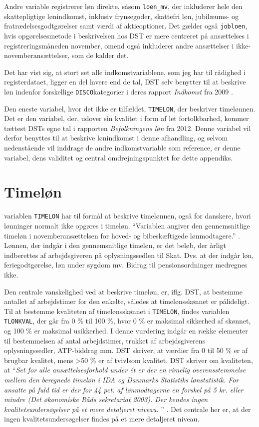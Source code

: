 Andre variable registrerer løn direkte, såsom \texttt{loen\_mv}, der inkluderer hele den skattepligtige lønindkomst, inklusiv frynsegoder, skattefri løn, jubilæums- og fratrædelsesgodtgørelser samt værdi af aktieoptioner. Det gælder også \texttt{jobloen}, hvis opgørelsesmetode i beskrivelsen hos DST er mere centreret på ansættelses i registreringsmåneden november, omend også inkluderer andre ansættelser i ikke-novemberansættelser, som de kalder det. \label{indkomstvariable}

Det har vist sig, at stort set alle indkomstvariablene, som jeg har til rådighed i registerdataet, ligger en del lavere end de tal, DST selv benytter til at beskrive løn indenfor forskellige \texttt{DISCO}kategorier i deres rapport \emph{Indkomst} fra 2009  \textcite{DST2009}.  

Den eneste variabel, hvor det ikke er tilfældet, \texttt{TIMELON}, der beskriver timelønnen. Det er den variabel, der, udover sin kvalitet i form af let fortolkbarhed, kommer tættest DSTs egne tal i rapporten \emph{Befolkningens løn} fra 2012. Denne variabel vil derfor benyttes til at beskrive lønindkomst i denne afhandling, og selvom nedenstående vil inddrage de andre indkomstvariable som reference, er denne variabel, dens validitet og central omdrejningspunktet for dette appendiks. 

\section{Timeløn \label{}}

variablen \texttt{TIMELON} har til formål at beskrive timelønnen, også for danskere, hvori lønninger normalt ikke opgøres i timeløn. “Variablen angiver den gennemsnitlige timeløn i novemberansættelsen for hoved- og bibeskæftigede lønmodtagere.” \parencite{DST-TIMELON}. Lønnen, der indgår i den gennemsnitlige timeløn, er det beløb, der årligt indberettes af arbejdsgiveren på oplysningssedlen til Skat. Dvs. at der indgår løn, feriegodtgørelse, løn under sygdom mv. Bidrag til pensionsordninger medregnes ikke. 

Den centrale vanskelighed ved at beskrive timeløn, er, iflg. DST, at bestemme antallet af arbejdstimer for den enkelte, således at timelønsskønnet er pålideligt. Til at bestemme kvaliteten af timelønsskønnet i \texttt{TIMELON}, findes variablen \texttt{TLONKVAL}, der går fra 0 \% til 100 \%, hvor 0 \% er maksimal sikkerhed af skønnet, og 100 \% er maksimal usikkerhed. I denne vurdering indgår en række elementer til bestemmelsen af antal arbejdstimer, trukket af arbejdsgiverens oplysningssedler, ATP-biddrag mm. DST skriver, at værdier fra 0 til 50 \% er af brugbar kvalitet, mens >50 \% er af tvivlsom kvalitet. DST skriver om kvaliteten, at “\emph{Set for alle ansættelsesforhold under ét er der en rimelig overensstemmelse mellem den beregnede timeløn i IDA og Danmarks Statistiks lønstatistik. For ansatte på fuld tid er der for 44 pct. af lønmodtagerne en forskel på 5 kr. eller mindre (Det økonomiske Råds sekretariat 2003). Der kendes ingen kvalitetsundersøgelser på et mere detaljeret niveau. }” \parencite{DST-TIMELON}. Det centrale her er, at der ingen kvalitetsundersøgelser findes på et mere detaljeret niveau. 

